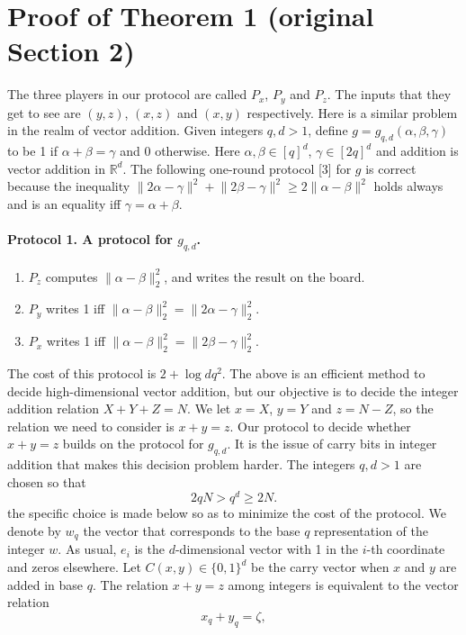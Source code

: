 \documentclass[10pt,a4paper]{article}
\newcommand{\norm}[1]{\lVert#1\rVert}
\begin{document}
\section*{Proof of Theorem 1 (original Section 2)}
The three players in our protocol are called $P_x$, $P_y$ and $P_z$. The inputs that they get to see are $(y,z)$, $(x,z)$ and $(x,y)$ respectively.
Here is a similar problem in the realm of vector addition. Given integers $q,d>1$, define $g=g_{q,d}(\alpha,\beta,\gamma)$ to be 1 if $\alpha+\beta=\gamma$ and 0 otherwise. Here $\alpha,\beta\in[q]^d$, $\gamma\in[2q]^d$ and addition is vector addition in $\mathbb R^d$. The following one-round protocol [3] for $g$ is correct because the inequality $\norm{2\alpha-\gamma}^2+\norm{2\beta-\gamma}^2\ge2\norm{\alpha-\beta}^2$ holds always and is an equality iff $\gamma=\alpha+\beta$.
\paragraph{Protocol 1. A protocol for $g_{q,d}$.}
\begin{enumerate}
\item $P_z$ computes $\norm{\alpha-\beta}_2^2$, and writes the result on the board.
\item $P_y$ writes 1 iff $\norm{\alpha-\beta}_2^2=\norm{2\alpha-\gamma}_2^2$.
\item $P_x$ writes 1 iff $\norm{\alpha-\beta}_2^2=\norm{2\beta-\gamma}_2^2$.
\end{enumerate}
The cost of this protocol is $2+\log dq^2$.
The above is an efficient method to decide high-dimensional vector addition, but our objective is to decide the integer addition relation $X+Y+Z=N$. We let $x=X$, $y=Y$ and $z=N-Z$, so the relation we need to consider is $x+y=z$.
Our protocol to decide whether $x+y=z$ builds on the protocol for $g_{q,d}$. It is the issue of carry bits in integer addition that makes this decision problem harder. The integers $q,d>1$ are chosen so that
\begin{equation}2qN>q^d\ge2N.\tag{3}\label{eq:range}\end{equation}
the specific choice is made below so as to minimize the cost of the protocol.
We denote by $w_q$ the vector that corresponds to the base $q$ representation of the integer $w$. As usual, $e_i$ is the $d$-dimensional vector with 1 in the $i$-th coordinate and zeros elsewhere.
Let $C(x,y)\in\{0,1\}^d$ be the carry vector when $x$ and $y$ are added in base $q$. The relation $x+y=z$ among integers is equivalent to the vector relation
\[x_q+y_q=\zeta,\]
\end{document}
